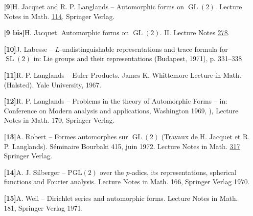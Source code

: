 \documentclass[10pt,a4paper]{article}
\providecommand{\GL}{\operatorname{GL}}
\providecommand{\SL}{\operatorname{SL}}
\begin{document}
\noindent\textbf{[9]}\quad H. Jacquet and R. P. Langlands -- Automorphic forms on \(\GL(2)\). Lecture Notes in Math. \underline{114}, Springer Verlag.\par\medskip

\noindent\textbf{[9 bis]}\quad H. Jacquet. Automorphic forms on \(\GL(2)\). II. Lecture Notes \underline{278}.\par\medskip

\noindent\textbf{[10]}\quad J. Labesse -- \(L\)-undistinguishable representations and trace formula for \(\SL(2)\) in: Lie groups and their representations (Budapest, 1971), p. 331--338\par\medskip

\noindent\textbf{[11]}\quad R. P. Langlands -- Euler Products. James K. Whittemore Lecture in Math. (Halsted). Yale University, 1967.\par\medskip

\noindent\textbf{[12]}\quad R. P. Langlands -- Problems in the theory of Automorphic Forms -- in: Conference on Modern analysis and applications, Washington 1969, ), Lecture Notes in Math. 170, Springer Verlag.\par\medskip

\noindent\textbf{[13]}\quad A. Robert -- Formes automorphes sur \(\GL(2)\) (Travaux de H. Jacquet et R. P. Langlands). Séminaire Bourbaki 415, juin 1972. Lecture Notes in Math. \underline{317} Springer Verlag.\par\medskip

\noindent\textbf{[14]}\quad A. J. Silberger -- \(\mathrm{PGL}(2)\) over the \(p\)-adics, its representations, spherical functions and Fourier analysis. Lecture Notes in Math. 166, Springer Verlag 1970.\par\medskip

\noindent\textbf{[15]}\quad A. Weil -- Dirichlet series and automorphic forms. Lecture Notes in Math. 181, Springer Verlag 1971.\par\medskip
\end{document}
